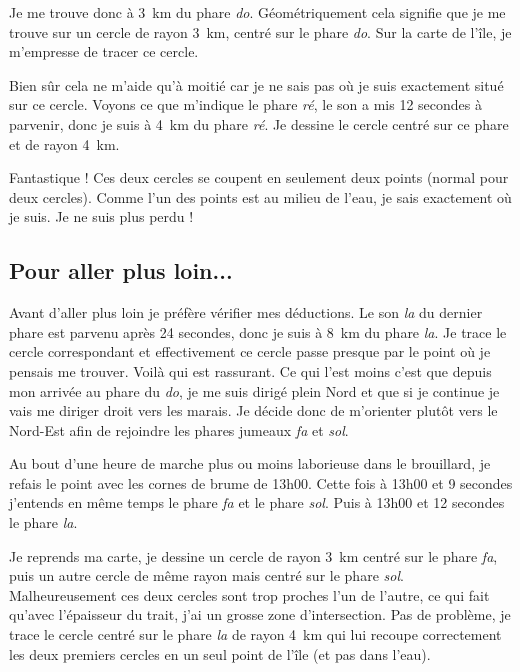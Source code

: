 \documentclass[class=report,crop=false]{standalone}
\begin{document}
Je me trouve donc à \SI{3}{\kilo \meter} du phare \emph{do}. Géométriquement cela signifie que je me trouve
sur un cercle de rayon \SI{3}{\kilo \meter}, centré sur le phare \emph{do}.
Sur la carte de l'île, je m'empresse de tracer ce cercle.


Bien sûr cela ne m'aide qu'à moitié car je ne sais pas où je suis exactement situé sur ce cercle.
Voyons ce que m'indique le phare \emph{ré}, le son a mis 12 secondes à parvenir, donc je suis 
à \SI{4}{\kilo \meter} du phare \emph{ré}. Je dessine le cercle centré sur ce phare et de rayon 
\SI{4}{\kilo \meter}. 

Fantastique ! Ces deux cercles se coupent en seulement deux points (normal pour deux cercles).
Comme l'un des points est au milieu de l'eau, je sais exactement où je suis.
Je ne suis plus perdu !




\subsection{Pour aller plus loin...}

Avant d'aller plus loin je préfère vérifier mes déductions.
Le son \emph{la} du dernier phare est parvenu après 24 secondes, donc je suis
à \SI{8}{\kilo \meter} du phare \emph{la}. Je trace le cercle correspondant
et effectivement ce cercle passe presque par le point où je pensais me trouver.
Voilà qui est rassurant.
Ce qui l'est moins c'est que depuis mon arrivée au phare du \emph{do}, je me suis dirigé 
plein Nord et que si je continue je vais me diriger droit vers les marais.
Je décide donc de m'orienter plutôt vers le Nord-Est afin de rejoindre les phares 
jumeaux \emph{fa} et \emph{sol}.

Au bout d'une heure de marche plus ou moins laborieuse dans le brouillard, je refais le point
avec les cornes de brume de 13h00.
Cette fois à 13h00 et 9 secondes j'entends en même temps le phare \emph{fa} et le phare \emph{sol}.
Puis à 13h00 et 12 secondes le phare \emph{la}.



Je reprends ma carte, je dessine un cercle de rayon \SI{3}{\kilo \meter}
centré sur le phare \emph{fa}, puis un autre cercle de même rayon mais centré sur le phare 
\emph{sol}. Malheureusement ces deux cercles sont trop proches l'un de l'autre, ce qui fait
qu'avec l'épaisseur du trait, j'ai un grosse zone d'intersection.
Pas de problème, je trace le cercle centré sur le phare \emph{la} de rayon \SI{4}{\kilo \meter}
qui lui recoupe correctement les deux premiers cercles
en un seul point de l'île (et pas dans l'eau).
\end{document}
